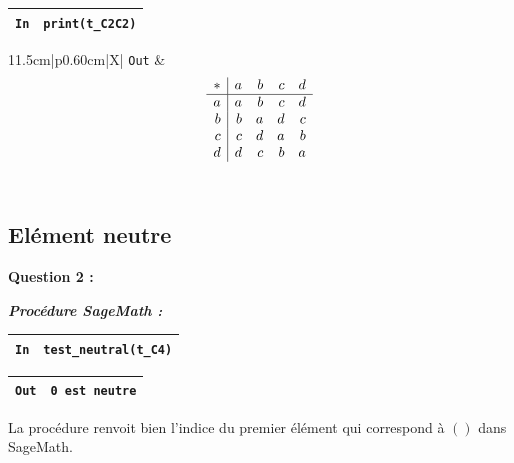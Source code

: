 \documentclass[titlepage]{article}
\begin{document}
        \begin{tabularx}{11.5cm}{|p{0.60cm}|X|}
            \hline
            \verb|In|
            & 
            \verb|print(t_C2C2)|
            \\
            \hline
        \end{tabularx}

        \begin{tabularx}{11.5cm}{|p{0.60cm}|X|}
            \hline
            \verb|Out|
            & 
            {\setlength{\arraycolsep}{2ex}
            \[\begin{array}{r|*{4}{r}}
                \multicolumn{1}{c|}{\ast}&a&b&c&d\\\hline
                {}a&a&b&c&d\\
                {}b&b&a&d&c\\
                {}c&c&d&a&b\\
                {}d&d&c&b&a\\
            \end{array}\]}
            \\
            \hline
        \end{tabularx}

        \pagebreak
        \subsection{Elément neutre}
        \textbf{Question 2 :}
        
        \emph{\textbf{Procédure SageMath :}}

        

        \begin{tabularx}{11.5cm}{|p{0.60cm}|X|}
            \hline
            \verb|In|
            & 
            \verb|test_neutral(t_C4)|
            \\
            \hline
        \end{tabularx}

        \begin{tabularx}{11.5cm}{|p{0.60cm}|X|}
            \hline
            \verb|Out|
            & 
            \verb|0 est neutre|
            \\
            \hline
        \end{tabularx} 
        \newline
        
        La procédure renvoit bien l'indice du premier élément qui correspond à $()$ dans SageMath.
        \newline
\end{document}
